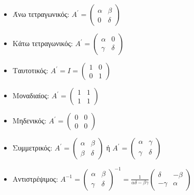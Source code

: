 \documentclass[a4paper,12pt]{article}
\begin{document}
\begin{itemize}
    \item Άνω τετραγωνικός:
          $A^{'} = \begin{pmatrix}
                  \alpha & \beta  \\
                  0      & \delta
              \end{pmatrix}$
    \item Κάτω τετραγωνικός:
          $A^{'} = \begin{pmatrix}
                  \alpha & 0      \\
                  \gamma & \delta
              \end{pmatrix}$
    \item Ταυτοτικός:
          $A^{'} = I = \begin{pmatrix}
                  1 & 0 \\
                  0 & 1
              \end{pmatrix}$
    \item Μοναδιαίος:
          $A^{'} = \begin{pmatrix}
                  1 & 1 \\
                  1 & 1
              \end{pmatrix}$
    \item Μηδενικός:
          $A^{'} = \begin{pmatrix}
                  0 & 0 \\
                  0 & 0
              \end{pmatrix}$
    \item Συμμετρικός:
          $A^{'} = \begin{pmatrix}
                  \alpha & \beta  \\
                  \beta  & \delta
              \end{pmatrix}$
          ή
          $A^{'} = \begin{pmatrix}
                  \alpha & \gamma \\
                  \gamma & \delta
              \end{pmatrix}$
    \item Αντιστρέψιμος:
          $A^{-1} = \begin{pmatrix}
                  \alpha & \beta  \\
                  \gamma & \delta
              \end{pmatrix}^{-1} =
              \frac{1}{\alpha\delta-\beta\gamma}\begin{pmatrix}
                  \delta  & -\beta \\
                  -\gamma & \alpha
              \end{pmatrix}$
\end{itemize}
\end{document}
